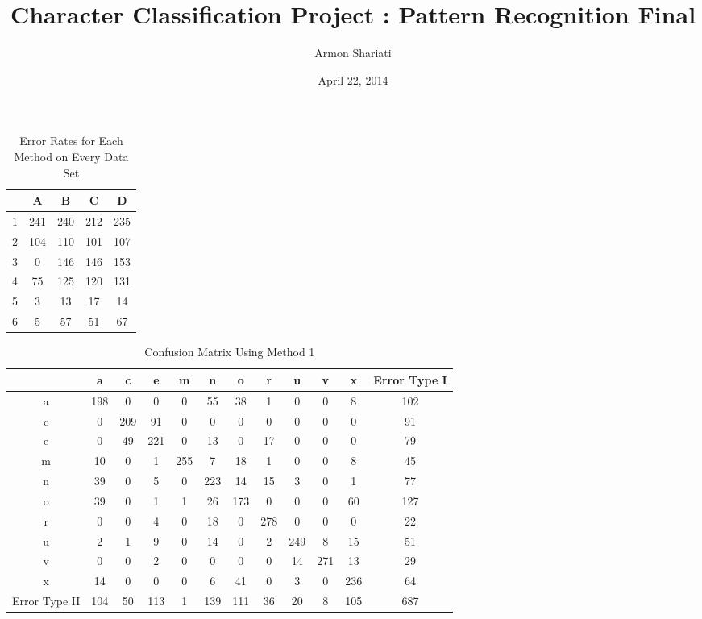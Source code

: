\documentclass[12pt]{article}
\begin{document}
\title{Character Classification Project : Pattern Recognition Final}
\author{Armon Shariati}
\date{April 22, 2014}
\maketitle

\begin{table*}
    \centering
    \caption{Error Rates for Each Method on Every Data Set}
    \begin{tabular}{| c | c | c | c | c |} \hline
        & A & B & C & D\\ \hline
      1 & 241 & 240 & 212 & 235\\ \hline
      2 & 104 & 110 & 101 & 107\\ \hline
      3 & 0 & 146 & 146 & 153\\ \hline
      4 & 75 & 125 & 120 & 131\\ \hline
      5 & 3 & 13 & 17 & 14\\ \hline
      6 & 5 & 57 & 51 & 67\\ \hline
    \end{tabular}
\end{table*}


\begin{table*}
    \centering
    \caption{Confusion Matrix Using Method 1}
    \begin{tabular}{| c | c | c | c | c | c | c | c | c | c | c | c |} \hline
        & a & c & e & m & n & o & r & u & v & x & Error Type I\\ \hline
      a & 198 & 0 & 0 & 0 & 55 & 38 & 1 & 0 & 0 & 8 & 102\\ \hline
      c & 0 & 209 & 91 & 0 & 0 & 0 & 0 & 0 & 0 & 0 & 91\\ \hline
      e & 0 & 49 & 221 & 0 & 13 & 0 & 17 & 0 & 0 & 0 & 79\\ \hline
      m & 10 & 0 & 1 & 255 & 7 & 18 & 1 & 0 & 0 & 8 & 45\\ \hline
      n & 39 & 0 & 5 & 0 & 223 & 14 & 15 & 3 & 0 & 1 & 77\\ \hline
      o & 39 & 0 & 1 & 1 & 26 & 173 & 0 & 0 & 0 & 60 & 127\\ \hline
      r & 0 & 0 & 4 & 0 & 18 & 0 & 278 & 0 & 0 & 0 & 22\\ \hline
      u & 2 & 1 & 9 & 0 & 14 & 0 & 2 & 249 & 8 & 15 & 51\\ \hline
      v & 0 & 0 & 2 & 0 & 0 & 0 & 0 & 14 & 271 & 13 & 29\\ \hline
      x & 14 & 0 & 0 & 0 & 6 & 41 & 0 & 3 & 0 & 236 & 64\\ \hline
Error Type II & 104 & 50 & 113 & 1 & 139 & 111 & 36 & 20 & 8 & 105 & 687\\ \hline
    \end{tabular}
\end{table*}
\end{document}
